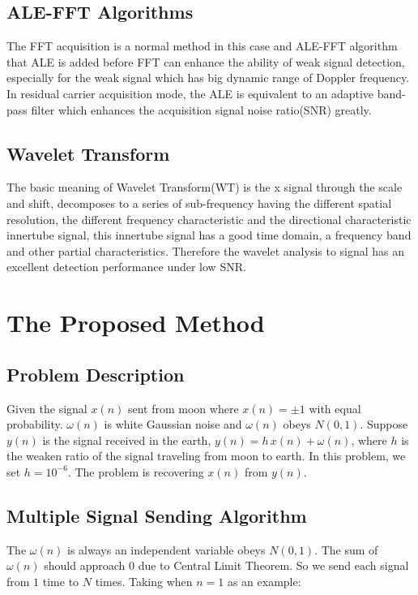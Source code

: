 \documentclass[conference]{IEEEtran}
\begin{document}
\subsection{ALE-FFT Algorithms\cite{b3}}
The FFT acquisition is a normal method in this case and ALE-FFT algorithm that ALE is added before FFT can enhance the ability of weak signal detection, especially for the weak signal which has big dynamic range of Doppler frequency. In residual carrier acquisition mode, the ALE is equivalent to an adaptive band-pass filter which enhances the acquisition signal noise ratio(SNR) greatly.

\subsection{Wavelet Transform\cite{b4}}
The basic meaning of Wavelet Transform(WT) is the x signal through the scale and shift, decomposes to a series of sub-frequency having the different spatial resolution, the different frequency characteristic and the directional characteristic innertube signal, this innertube signal has a good time domain, a frequency band and other partial characteristics. Therefore the wavelet analysis to signal has an excellent detection performance under low SNR.


\section{The Proposed Method}
\subsection{Problem Description}
Given the signal $x(n)$ sent from moon where $x(n)=\pm 1$ with equal probability. $\omega(n)$ is white Gaussian noise and $\omega(n)$ obeys $N(0,1)$. Suppose $y(n)$ is the signal received in the earth, $y(n) = h\,x(n) + \omega(n)$, where $h$ is the weaken ratio of the signal traveling from moon to earth. In this problem, we set $h = 10^{-6}$. The problem is recovering $x(n)$ from $y(n)$.

\subsection{Multiple Signal Sending Algorithm}
The $\omega(n)$ is always an independent variable obeys $N(0,1)$. The sum of $\omega(n)$ should approach $0$ due to Central Limit Theorem\cite{b5}. So we send each signal from $1$ time to $N$ times. Taking when $n=1$ as an example:
\end{document}
